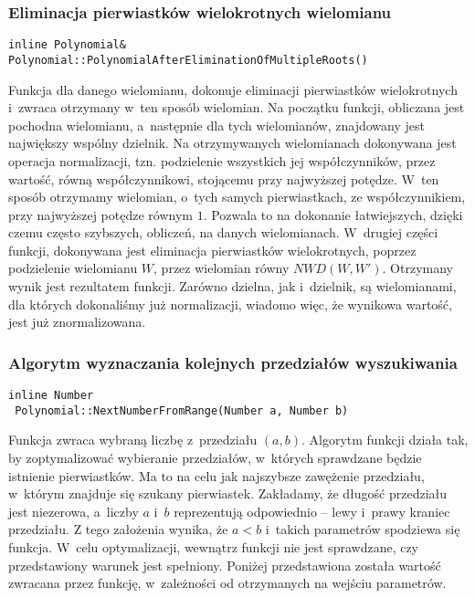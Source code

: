 \subsubsection{Eliminacja pierwiastków wielokrotnych wielomianu}
\begin{lstlisting}
inline Polynomial&
Polynomial::PolynomialAfterEliminationOfMultipleRoots()
\end{lstlisting}

Funkcja dla danego wielomianu, dokonuje eliminacji pierwiastków wielokrotnych i~zwraca otrzymany w~ten sposób wielomian. Na początku funkcji, obliczana jest pochodna wielomianu, a~następnie dla tych wielomianów, znajdowany jest największy wspólny dzielnik. Na otrzymywanych wielomianach dokonywana jest operacja normalizacji, tzn. podzielenie wszystkich jej współczynników, przez wartość, równą współczynnikowi, stojącemu przy najwyższej potędze. W~ten sposób otrzymamy wielomian, o~tych samych pierwiastkach, ze współczynnikiem, przy najwyższej potędze równym $1$. Pozwala to na dokonanie łatwiejszych, dzięki czemu często szybszych, obliczeń, na danych wielomianach. W~drugiej części funkcji, dokonywana jest eliminacja pierwiastków wielokrotnych, poprzez podzielenie wielomianu $W$, przez wielomian równy $NWD(W, W')$. Otrzymany wynik jest rezultatem funkcji. Zarówno dzielna, jak i~dzielnik, są wielomianami, dla których dokonaliśmy już normalizacji, wiadomo więc, że wynikowa wartość, jest już znormalizowana.

\subsubsection{Algorytm wyznaczania kolejnych przedziałów wyszukiwania}
\begin{lstlisting}
inline Number
 Polynomial::NextNumberFromRange(Number a, Number b)
\end{lstlisting}

Funkcja zwraca wybraną liczbę z~przedziału $(a,b)$. Algorytm funkcji działa tak, by zoptymalizować wybieranie przedziałów, w~których sprawdzane będzie istnienie pierwiastków. Ma to na celu jak najszybsze zawężenie przedziału, w~którym znajduje się szukany pierwiastek. Zakładamy, że długość przedziału jest niezerowa, a~liczby $a$ i~$b$ reprezentują odpowiednio -- lewy i~prawy kraniec przedziału. Z tego założenia wynika, że $a<b$ i~takich parametrów spodziewa się funkcja. W~celu optymalizacji, wewnątrz funkcji nie jest sprawdzane, czy przedstawiony warunek jest spełniony. Poniżej przedstawiona została wartość zwracana przez funkcję, w~zależności od otrzymanych na wejściu parametrów.


